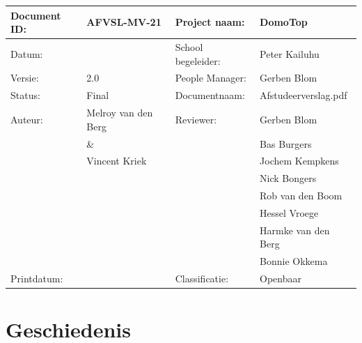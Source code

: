 \documentclass[]{article}
\makeatletter
\let\insertdate\@date
\newcommand{\version}{2.0}
\makeatother
\begin{document}
\vspace*{\fill}

\begin{tabular}{|| l | l || l | l ||}\hline
   Document ID: & AFVSL-MV-21          &Project naam:     &DomoTop             \\\hline
   Datum:       &\insertdate           &School begeleider:&Peter Kailuhu       \\\hline
   Versie:      &\version              &People Manager:   &Gerben Blom         \\\hline
   Status:      &Final                 &Documentnaam:     &Afstudeerverslag.pdf\\\hline
   Auteur:      &Melroy van den Berg   &Reviewer:         &Gerben Blom         \\
                & \&                   &                  &Bas Burgers         \\
                &Vincent Kriek         &                  &Jochem Kempkens     \\
                &                      &                  &Nick Bongers        \\
                &                      &                  &Rob van den Boom    \\
                &                      &                  &Hessel Vroege       \\
                &                      &                  &Harmke van den Berg \\
                &                      &                  &Bonnie Okkema       \\\hline
   Printdatum:  &\insertdate           &Classificatie:    &Openbaar            \\\hline
\end{tabular}

\newpage
\thispagestyle{empty}
\section*{Geschiedenis}
\end{document}
